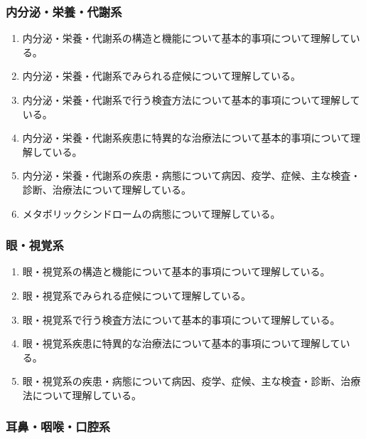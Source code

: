 \hypertarget{ux5185ux5206ux6cccux6804ux990aux4ee3ux8b1dux7cfb}{%
\subsubsection{内分泌・栄養・代謝系}\label{ux5185ux5206ux6cccux6804ux990aux4ee3ux8b1dux7cfb}}

\begin{enumerate}
\def\labelenumi{\arabic{enumi}.}
\tightlist
\item
  内分泌・栄養・代謝系の構造と機能について基本的事項について理解している。
\item
  内分泌・栄養・代謝系でみられる症候について理解している。
\item
  内分泌・栄養・代謝系で行う検査方法について基本的事項について理解している。
\item
  内分泌・栄養・代謝系疾患に特異的な治療法について基本的事項について理解している。
\item
  内分泌・栄養・代謝系の疾患・病態について病因、疫学、症候、主な検査・診断、治療法について理解している。
\item
  メタボリックシンドロームの病態について理解している。
\end{enumerate}

\hypertarget{ux773cux8996ux899aux7cfb}{%
\subsubsection{眼・視覚系}\label{ux773cux8996ux899aux7cfb}}

\begin{enumerate}
\def\labelenumi{\arabic{enumi}.}
\tightlist
\item
  眼・視覚系の構造と機能について基本的事項について理解している。
\item
  眼・視覚系でみられる症候について理解している。
\item
  眼・視覚系で行う検査方法について基本的事項について理解している。
\item
  眼・視覚系疾患に特異的な治療法について基本的事項について理解している。
\item
  眼・視覚系の疾患・病態について病因、疫学、症候、主な検査・診断、治療法について理解している。
\end{enumerate}

\hypertarget{ux8033ux9f3bux54bdux5589ux53e3ux8154ux7cfb}{%
\subsubsection{耳鼻・咽喉・口腔系}\label{ux8033ux9f3bux54bdux5589ux53e3ux8154ux7cfb}}

